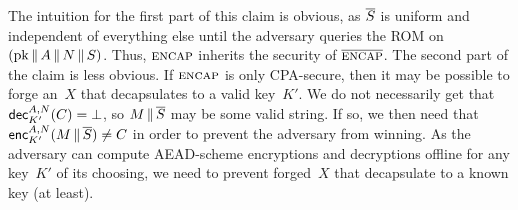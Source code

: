 The intuition for the first part of this claim is obvious, as $\overline{S}$ is uniform and independent of everything else until the adversary queries the ROM on $(\mathrm{pk} \,\|\, A \,\|\, N \,\|\, S)$.  Thus, $\textsc{encap}$ inherits the security of $\overline{\textsc{encap}}$.   The second part of the claim is less obvious.  If $\textsc{encap}$ is only CPA-secure, then it may be possible to forge an~$X$ that decapsulates to a valid key~$K'$.  We do not necessarily get that ${\mathsf{dec}}_{K'}^{A,N}(C)=\bot$, so $M \,\|\, \overline{S}$ may be some valid string.  If so, we then need that ${\mathsf{enc}}_{K'}^{A,N}(M \,\|\, \overline{S}) \neq C$ in order to prevent the adversary from winning.  As the adversary can compute AEAD-scheme encryptions and decryptions offline for any key~$K'$ of its choosing, we need to prevent forged~$X$ that decapsulate to a known key (at least).

